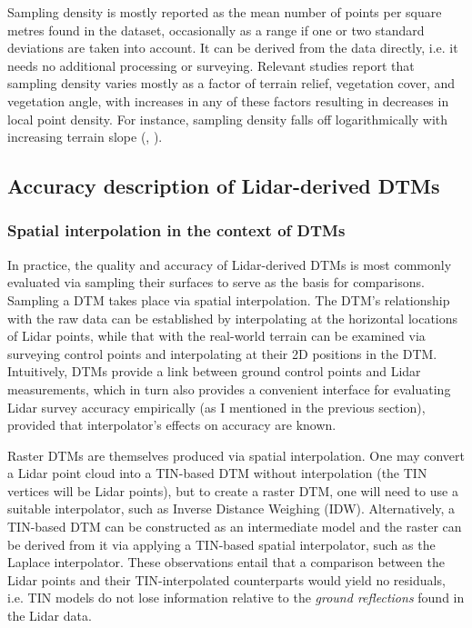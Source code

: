 Sampling density is mostly reported as the mean number of points per square metres found in the dataset, occasionally as a range if one or two standard deviations are taken into account. It can be derived from the data directly, i.e. it needs no additional processing or surveying. Relevant studies report that sampling density varies mostly as a factor of terrain relief, vegetation cover, and vegetation angle, with increases in any of these factors resulting in decreases in local point density. For instance, sampling density falls off logarithmically with increasing terrain slope (\cite{peng_shih_2006}, \cite{chow_hodgson_2009}).

\subsection{Accuracy description of Lidar-derived DTMs}
\label{sub:lidaraccuracy_dem}

\subsubsection{Spatial interpolation in the context of DTMs}

In practice, the quality and accuracy of Lidar-derived DTMs is most commonly evaluated via sampling their surfaces to serve as the basis for comparisons. Sampling a DTM takes place via spatial interpolation. The DTM's relationship with the raw data can be established by interpolating at the horizontal locations of Lidar points, while that with the real-world terrain can be examined via surveying control points and interpolating at their 2D positions in the DTM. Intuitively, DTMs provide a link between ground control points and Lidar measurements, which in turn also provides a convenient interface for evaluating Lidar survey accuracy empirically (as I mentioned in the previous section), provided that interpolator's effects on accuracy are known.

Raster DTMs are themselves produced via spatial interpolation. One may convert a Lidar point cloud into a TIN-based DTM without interpolation (the TIN vertices will be Lidar points), but to create a raster DTM, one will need to use a suitable interpolator, such as Inverse Distance Weighing (IDW). Alternatively, a TIN-based DTM can be constructed as an intermediate model and the raster can be derived from it via applying a TIN-based spatial interpolator, such as the Laplace interpolator. These observations entail that a comparison between the Lidar points and their TIN-interpolated counterparts would yield no residuals, i.e. TIN models do not lose information relative to the \textit{ground reflections} found in the Lidar data.

